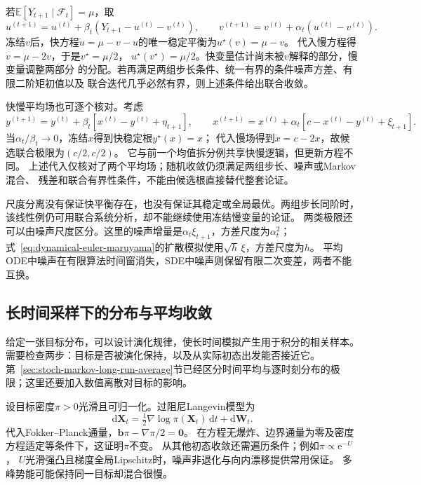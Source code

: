 \begin{example}[分解同一个未知均值的快慢更新]
  \label{ex:stoch-two-timescale-mean-splitting}
  若$\mathbb E[Y_{t+1}\mid\mathcal F_t]=\mu$，取
  \[
    u^{(t+1)}=u^{(t)}+\beta_t(Y_{t+1}-u^{(t)}-v^{(t)}),\qquad
    v^{(t+1)}=v^{(t)}+\alpha_t(u^{(t)}-v^{(t)}).
  \]
  冻结$v$后，快方程$\dot u=\mu-v-u$的唯一稳定平衡为$u^\star(v)=\mu-v$。
  代入慢方程得$\dot v=\mu-2v$，于是$v^\star=\mu/2$，
  $u^\star(v^\star)=\mu/2$。快变量估计尚未被$v$解释的部分，慢变量调整两部分
  的分配。若再满足两组步长条件、统一有界的条件噪声方差、有限二阶矩初值以及
  联合迭代几乎必然有界，则上述条件给出联合收敛。
\end{example}
快慢平均场也可逐个核对。考虑
\[
  y^{(t+1)}=y^{(t)}+\beta_t[x^{(t)}-y^{(t)}+\eta_{t+1}],\qquad
  x^{(t+1)}=x^{(t)}+\alpha_t[c-x^{(t)}-y^{(t)}+\xi_{t+1}].
\]
当$\alpha_t/\beta_t\to0$，冻结$x$得到快稳定根$y^\star(x)=x$；
代入慢场得到$\dot x=c-2x$，故候选联合极限为$(c/2,c/2)$。
它与前一个均值拆分例共享快慢逻辑，但更新方程不同。
上述代入仅核对了两个平均场；随机收敛仍须满足两组步长、噪声或Markov混合、
残差和联合有界性条件，不能由候选根直接替代整套论证。

尺度分离没有保证快平衡存在，也没有保证其稳定或全局最优。两组步长同阶时，
该线性例仍可用联合系统分析，却不能继续使用冻结慢变量的论证。
两类极限还可以由噪声尺度区分。这里的噪声增量是$\alpha_t\xi_{t+1}$，方差尺度为$\alpha_t^2$；式~\eqref{eq:dynamical-euler-maruyama}的扩散模拟使用$\sqrt h\,\xi$，方差尺度为$h$。
平均ODE中噪声在有限算法时间窗消失，SDE中噪声则保留有限二次变差，两者不能互换。

\subsection{长时间采样下的分布与平均收敛}
给定一张目标分布，可以设计演化规律，使长时间模拟产生用于积分的相关样本。需要检查两步：目标是否被演化保持，以及从实际初态出发能否接近它。第~\ref{sec:stoch-markov-long-run-average}节已经区分时间平均与逐时刻分布的极限；这里还要加入数值离散对目标的影响。

设目标密度$\pi>0$光滑且可归一化。过阻尼Langevin模型为
\begin{equation}
 \mathrm d\bm X_t=\tfrac12\nabla\log\pi(\bm X_t)\,\mathrm dt+\mathrm d\bm W_t.
 \label{eq:dynamical-langevin-sde}
\end{equation}
代入Fokker--Planck通量，$\bm b\pi-\nabla\pi/2=\bm0$。
在方程无爆炸、边界通量为零及密度方程适定等条件下，这证明$\pi$不变。
从其他初态收敛还需遍历条件；例如$\pi\propto\mathrm e^{-U}$，
$U$光滑强凸且梯度全局Lipschitz时，噪声非退化与向内漂移提供常用保证。
多峰势能可能保持同一目标却混合很慢。

